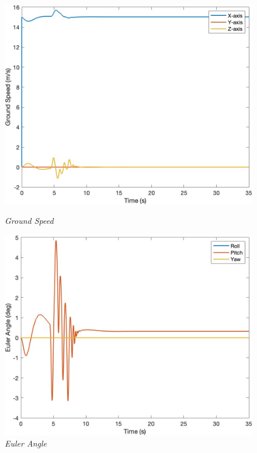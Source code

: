 \begin{figure}[htbp]
  \begin{minipage}[b]{0.45\textwidth}
    \centering
    \includegraphics[width=\textwidth]{Images/Gust/Gust FWD pulse 0428/3 groundspeed_2.jpg}
    \caption*{\textit{Ground Speed}}
  \end{minipage}
  \hfil
  \begin{minipage}[b]{0.45\textwidth}
    \centering
    \includegraphics[width=\textwidth]{Images/Gust/Gust FWD pulse 0428/4 EulerAngle_2.jpg}
    \caption*{\textit{Euler Angle}}
  \end{minipage}
  \begin{minipage}[b]{0.45\textwidth}

\end{minipage}
\end{figure}
